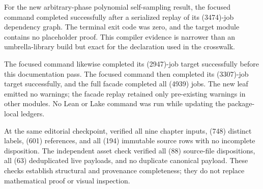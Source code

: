 For the new arbitrary-phase polynomial self-sampling result, the focused
command
completed successfully after a serialized replay of its (3474)-job
dependency graph.  The terminal exit code was zero, and the target module
contains no placeholder proof.  This compiler evidence is narrower than an
umbrella-library build but exact for the declaration used in the crosswalk.

The focused command
 likewise
completed its (2947)-job target successfully before this documentation pass.
The focused command
 then completed
its (3307)-job target successfully, and the full
 facade completed all (4939) jobs.  The new
leaf emitted no warnings; the facade replay retained only pre-existing
warnings in other modules.  No Lean or Lake command was run while updating
the package-local ledgers.

At the same editorial checkpoint,
 verified all nine chapter inputs,
(748) distinct labels, (601) references, and all (194) immutable source
rows with no incomplete disposition.  The independent asset check verified
all (88) source-file dispositions, all (63) deduplicated live payloads,
and no duplicate canonical payload.  These checks establish structural and
provenance completeness; they do not replace mathematical proof or visual
inspection.

